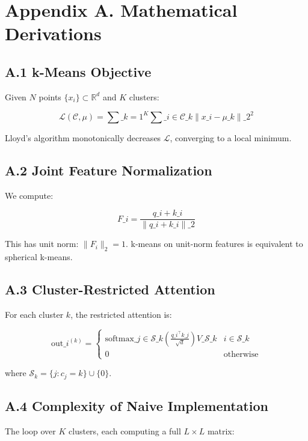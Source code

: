 
\section{Appendix A. Mathematical Derivations}

\subsection{A.1 k-Means Objective}

Given $N$ points $\{x_i\} \subset \mathbb{R}^d$ and $K$ clusters:

\[
\mathcal{L}(\mathcal{C}, \mu) = \sum\_{k=1}^{K} \sum\_{i \in \mathcal{C}\_k} \|x\_i - \mu\_k\|\_2^2
\tag{A.1}
\]

Lloyd's algorithm monotonically decreases $\mathcal{L}$, converging to a 
local minimum.

\subsection{A.2 Joint Feature Normalization}

We compute:

\[
F\_i = \frac{q\_i + k\_i}{\|q\_i + k\_i\|\_2}
\tag{A.2}
\]

This has unit norm: $\|F_i\|_2 = 1$. k-means on unit-norm features is 
equivalent to spherical k-means.

\subsection{A.3 Cluster-Restricted Attention}

For each cluster $k$, the restricted attention is:

\[
\text{out}\_i^{(k)} = \begin{cases} 
\text{softmax}\_{j \in \mathcal{S}\_k}\!\left(\frac{q\_i^\top k\_j}{\sqrt{d}}\right) V\_{\mathcal{S}\_k} & i \in \mathcal{S}\_k \\
0 & \text{otherwise}
\end{cases}
\tag{A.3}
\]

where $\mathcal{S}_k = \{j : c_j = k\} \cup \{0\}$.

\subsection{A.4 Complexity of Naive Implementation}

The loop over $K$ clusters, each computing a full $L \times L$ matrix:

